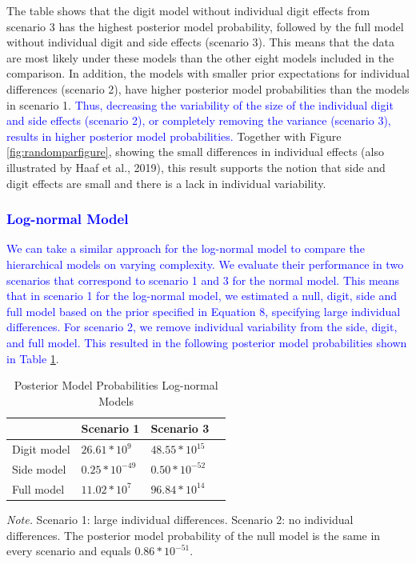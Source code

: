 \documentclass[
  english,
  doc,floatsintext]{apa6}
\begin{document}
The table shows that the digit model without individual digit effects from scenario 3 has the highest posterior model probability, followed by the full model without individual digit and side effects (scenario 3). This means that the data are most likely under these models than the other eight models included in the comparison. In addition, the models with smaller prior expectations for individual differences (scenario 2), have higher posterior model probabilities than the models in scenario 1. \textcolor{blue}{Thus, decreasing the variability of the size of the individual digit and side effects (scenario 2), or completely removing the variance (scenario 3), results in higher posterior model probabilities.} Together with Figure \ref{fig:randomparfigure}, showing the small differences in individual effects (also illustrated by Haaf et al., 2019), this result supports the notion that side and digit effects are small and there is a lack in individual variability.

\hypertarget{section}{%
\subsubsection{\texorpdfstring{\textcolor{blue}{Log-normal Model}}{}}\label{section}}

\textcolor{blue}{We can take a similar approach for the log-normal model to compare the hierarchical models on varying complexity. We evaluate their performance in two scenarios that correspond to scenario 1 and 3 for the normal model. This means that in scenario 1 for the log-normal model, we estimated a null, digit, side and full model based on the prior specified in Equation 8, specifying large individual differences. For scenario 2, we remove individual variability from the side, digit, and full model. This resulted in the following posterior model probabilities shown in Table} \ref{tab:postmodproblog}.

\begin{table}[H]
\caption{Posterior Model Probabilities Log-normal Models}
\label{tab:postmodproblog}
\begin{tabularx}{\textwidth}{XXXX}
\toprule
 & \multicolumn{1}{l}{Scenario 1} & \multicolumn{1}{l}{Scenario 3}\\
\midrule
Digit model & $26.61 * 10^9$ & $48.55 * 10^{15}$\\
Side model & $0.25 * 10^{-49}$  & $0.50 * 10^{-52}$ \\
Full model & $11.02 * 10^7$ &  $96.84 * 10^{14}$\\
\bottomrule
\end{tabularx}
\begin{tablenotes}[para]
\textit{Note.} Scenario 1: large individual differences. Scenario 2: no individual differences. The posterior model probability of the null model is the same in every scenario and equals $0.86*10^{-51}$. 
\end{tablenotes}
\end{table}
\end{document}
